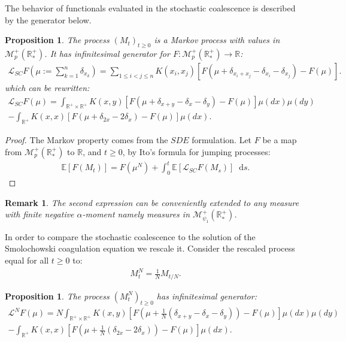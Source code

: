\documentclass[11pt,a4paper]{article}
\newcommand{\RR}{\mathbb{R}}
\newcommand{\RRP}{\mathbb{R}^+_*}
\newcommand{\MC}{\mathcal{M}}
\newcommand{\LC}{\mathcal{L}}
\newcommand{\E}[1]{\mathbb{E}\left[#1\right]}
\newcommand{\Proc}[1]{\left(#1\right)_{t\geq 0}}
\newcommand{\dd}{\mathop{}\!\mathrm{d}}
\newtheorem{remark}[theorem]{Remark}
\newtheorem{proposition}[theorem]{Proposition}
\begin{document}
The behavior of functionals evaluated in the stochastic coalescence is described by the generator below.
\begin{proposition}
    The process $\Proc{M_t}$  is a Markov process with values in $\MC_p^+(\RRP)$. It has infinitesimal generator for $F : \MC_p^+(\RRP) \to \RR$:
    \begin{align*}
        \LC_{SC} F\left(\mu := \sum\limits_{k = 1}^n\delta_{x_k} \right) = \sum\limits_{1\le i <j \le n} K(x_i,x_j) \left[F\left(\mu + \delta_{x_i + x_j} - \delta_{x_i} -\delta_{x_j}\right) - F(\mu)\right].
    \end{align*}
    which can be rewritten:
    \begin{multline*}
        \LC_{SC} F(\mu) = \int_{\RR^+ \times \RR^+} K(x,y)\left[ F\left(\mu + \delta_{x+y} - \delta_x - \delta_y \right) - F(\mu) \right]\mu(dx)\mu(dy) \\
        -\int_{\RR^+} K(x,x)\left[ F\left(\mu + \delta_{2x} - 2\delta_x \right) - F(\mu) \right]\mu(dx).
    \end{multline*}
\end{proposition}
\begin{proof}
    The Markov property comes from the $SDE$ formulation. Let $F$ be a map from $\MC_p^+(\RRP)$ to $\RR$, and $t \geq 0$, by Ito's formula for jumping processes:
    \begin{align*}
        \E{F(M_t)} = F(\mu^N) + \int_0^t \E{\LC_{SC} F\left(M_s\right)} \dd s.
    \end{align*}
\end{proof}
\begin{remark}
    The second expression can be conveniently extended to any measure with finite negative $\alpha$-moment namely measures in $\MC_{\psi_1}^+(\RRP)$.
\end{remark}
In order to compare the stochastic coalescence to the solution of the Smolochowski coagulation equation we rescale it. Consider the rescaled process equal for all $t \geq 0$ to:
\begin{align*}
    M^N_t = \frac{1}{N} M_{t/N}.
\end{align*}
\begin{proposition}
    The process $\Proc{M^N_{t}}$ has infinitesimal generator:
    \begin{multline*}
        \LC^N F(\mu) = N\int_{\RR^+ \times \RR^+} K(x,y)\left[ F\left(\mu + \frac{1}{N}\left(\delta_{x+y} - \delta_x - \delta_y\right) \right) - F(\mu) \right]\mu(dx)\mu(dy) \\
        -\int_{\RR^+} K(x,x)\left[ F\left(\mu + \frac{1}{N}\left(\delta_{2x} - 2\delta_x\right) \right) - F(\mu) \right]\mu(dx).
    \end{multline*}
\end{proposition}
\end{document}
